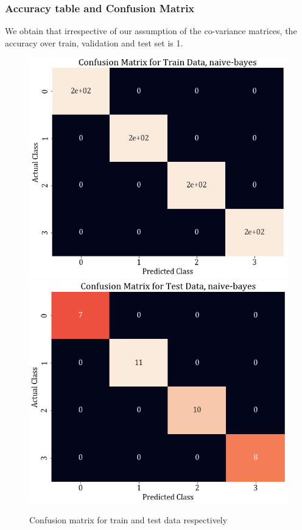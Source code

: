 \documentclass[11pt,a4paper]{article}
\begin{document}
\subsubsection{Accuracy table and Confusion Matrix}
We obtain that irrespective of our assumption of the co-variance matrices, the accuracy over train, validation and test set is 1. 


\begin{figure}[H]
    \centering
    \includegraphics[scale=0.4]{images/1a_conf_mat_nb_train.png}
    \includegraphics[scale=0.4]{images/1a_conf_mat_nb_test.png}
    \caption{Confusion matrix for train and test data respectively}
    \label{fig:conf_mats}
\end{figure}
\end{document}
